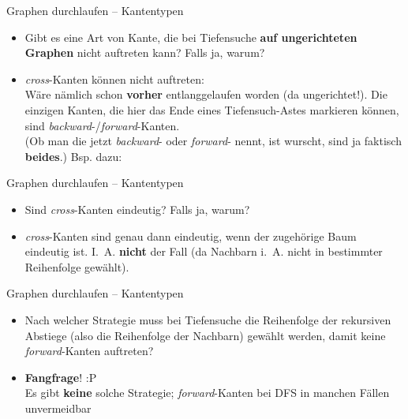 \begin{frame}{Graphen durchlaufen – Kantentypen}
	\begin{itemize}
		\item Gibt es eine Art von Kante, die bei Tiefensuche \textbf{auf ungerichteten Graphen} nicht auftreten kann? Falls ja, warum?
		\pause
		\item \emph{cross}-Kanten können nicht auftreten: \\
		Wäre nämlich schon \textbf{vorher} entlanggelaufen worden (da ungerichtet!). Die einzigen Kanten, die hier das Ende eines Tiefensuch-Astes markieren können, sind \emph{backward}-/\emph{forward}-Kanten. \\
		(Ob man die jetzt \emph{backward}- oder \emph{forward}- nennt, ist wurscht, sind ja faktisch \textbf{beides}.) Bsp. dazu:
	\end{itemize}
	\centering
\end{frame}

\begin{frame}{Graphen durchlaufen – Kantentypen}
	\begin{itemize}
		\item Sind \emph{cross}-Kanten eindeutig? Falls ja, warum?
		\pause
		\item \emph{cross}-Kanten sind genau dann eindeutig, wenn der zugehörige Baum eindeutig ist. \impl I.~A. \textbf{nicht} der Fall (da Nachbarn i.~A. nicht in bestimmter Reihenfolge gewählt).
	\end{itemize}
\end{frame}

\begin{frame}{Graphen durchlaufen – Kantentypen}
	\begin{itemize}
		\item Nach welcher Strategie muss bei Tiefensuche die Reihenfolge der rekursiven Abstiege (also die Reihenfolge der Nachbarn) gewählt werden, damit keine \textit{forward}-Kanten auftreten?
		\pause
		\item \textbf{Fangfrage}! :P \\
		Es gibt \textbf{keine} solche Strategie; \emph{forward}-Kanten bei DFS in manchen Fällen unvermeidbar
	\end{itemize}
\end{frame}	

